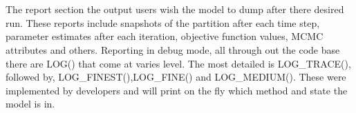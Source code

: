 \section{\label{sec:report-section}}
The report section the output users wish the model to dump after there desired run. These reports include snapshots of the partition after each time step, parameter estimates after each iteration, objective function values, MCMC attributes and others. Reporting in debug mode, all through out the code base there are LOG() that come at varies level. The most detailed is LOG\_TRACE(), followed by, LOG\_FINEST(),LOG\_FINE() and LOG\_MEDIUM(). These were implemented by developers and will print on the fly which method and state the model is in.

